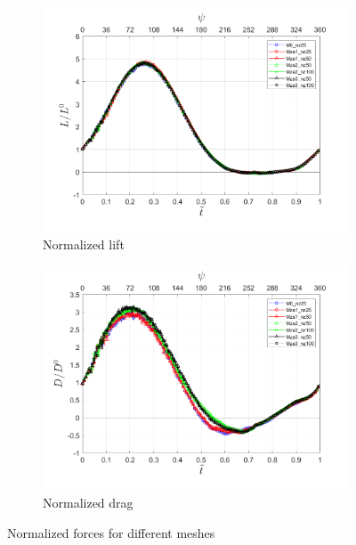 \begin{figure}[H]
\centering

\begin{subfigure}[b]{0.7\textwidth}
\centering
\includegraphics[width=1\textwidth]{figures/zonal_adapt_results/force_response/Lift.png}
\caption{Normalized lift}
\label{fig:lift_zonal_adapt}
\end{subfigure}
\begin{subfigure}[b]{0.7\textwidth}
\centering
\includegraphics[width=1\textwidth]{figures/zonal_adapt_results/force_response/Drag.png}
\caption{Normalized drag}
\label{fig:drag_zonal_adapt}
\end{subfigure}

\label{fig:force_response_zonal_adapt}
\caption{Normalized forces for different meshes}
\end{figure}